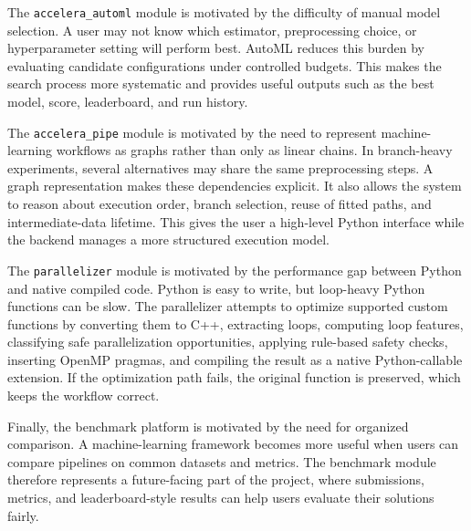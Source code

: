 \documentclass[12pt,a4paper]{report}
\begin{document}
The \texttt{accelera\_automl} module is motivated by the difficulty of manual
model selection. A user may not know which estimator, preprocessing choice, or
hyperparameter setting will perform best. AutoML reduces this burden by
evaluating candidate configurations under controlled budgets. This makes the
search process more systematic and provides useful outputs such as the best
model, score, leaderboard, and run history.

The \texttt{accelera\_pipe} module is motivated by the need to represent
machine-learning workflows as graphs rather than only as linear chains. In
branch-heavy experiments, several alternatives may share the same preprocessing
steps. A graph representation makes these dependencies explicit. It also allows
the system to reason about execution order, branch selection, reuse of fitted
paths, and intermediate-data lifetime. This gives the user a high-level Python
interface while the backend manages a more structured execution model.

The \texttt{parallelizer} module is motivated by the performance gap between
Python and native compiled code. Python is easy to write, but loop-heavy Python
functions can be slow. The parallelizer attempts to optimize supported custom
functions by converting them to C++, extracting loops, computing loop features,
classifying safe parallelization opportunities, applying rule-based safety
checks, inserting OpenMP pragmas, and compiling the result as a native
Python-callable extension. If the optimization path fails, the original function
is preserved, which keeps the workflow correct.

Finally, the benchmark platform is motivated by the need for organized
comparison. A machine-learning framework becomes more useful when users can
compare pipelines on common datasets and metrics. The benchmark module therefore
represents a future-facing part of the project, where submissions, metrics, and
leaderboard-style results can help users evaluate their solutions fairly.
\end{document}
